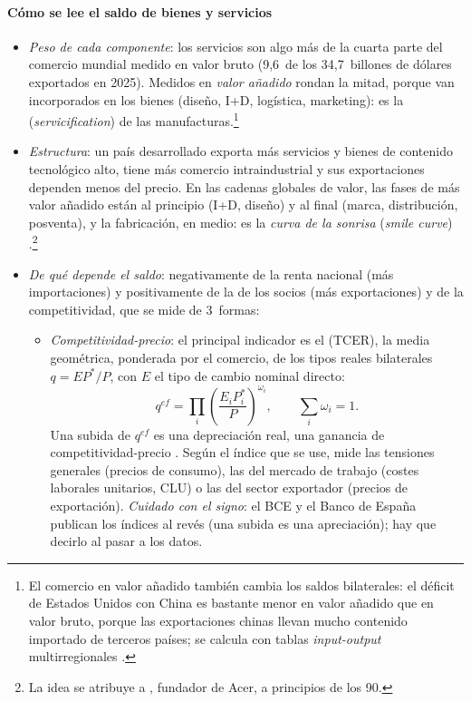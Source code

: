 \documentclass[11pt]{article}
\begin{document}
\paragraph{Cómo se lee el saldo de bienes y servicios}
\begin{itemize}
\item \emph{Peso de cada componente}: los servicios son algo más de la cuarta parte del comercio mundial medido en valor bruto (9,6~de los 34,7~billones de dólares exportados en 2025)\nocite{OMC2026GTO}. Medidos en \emph{valor añadido} rondan la mitad, porque van incorporados en los bienes (diseño, I+D, logística, marketing): es la  (\emph{servicification}) de las manufacturas\nocite{OCDE2023TiVA}.\footnote{El comercio en valor añadido también cambia los saldos bilaterales: el déficit de Estados Unidos con China es bastante menor en valor añadido que en valor bruto, porque las exportaciones chinas llevan mucho contenido importado de terceros países\nocite{OCDE2023TiVA}; se calcula con tablas \emph{input-output} multirregionales .}
\item \emph{Estructura}: un país desarrollado exporta más servicios y bienes de contenido tecnológico alto, tiene más comercio intraindustrial y sus exportaciones dependen menos del precio. En las cadenas globales de valor, las fases de más valor añadido están al principio (I+D, diseño) y al final (marca, distribución, posventa), y la fabricación, en medio: es la \emph{curva de la sonrisa} (\emph{smile curve}) .\footnote{La idea se atribuye a , fundador de Acer, a principios de los 90\nocite{Samper2017Marcas}.}
\item \emph{De qué depende el saldo}: negativamente de la renta nacional (más importaciones) y positivamente de la de los socios (más exportaciones) y de la competitividad, que se mide de 3~formas:
  \begin{itemize}
  \item \emph{Competitividad-precio}: el principal indicador es el  (TCER), la media geométrica, ponderada por el comercio, de los tipos reales bilaterales $q=EP^*/P$, con $E$ el tipo de cambio nominal directo:
\[
q^{ef}=\prod_i\left(\frac{E_iP_i^*}{P}\right)^{\omega_i},\qquad \sum_i\omega_i=1 .
\]
  Una subida de $q^{ef}$ es una depreciación real, una ganancia de competitividad-precio . Según el índice que se use, mide las tensiones generales (precios de consumo), las del mercado de trabajo (costes laborales unitarios, CLU) o las del sector exportador (precios de exportación). \emph{Cuidado con el signo}: el BCE y el Banco de España publican los índices al revés (una subida es una apreciación); hay que decirlo al pasar a los datos.

\end{itemize}
\end{itemize}
\end{document}
